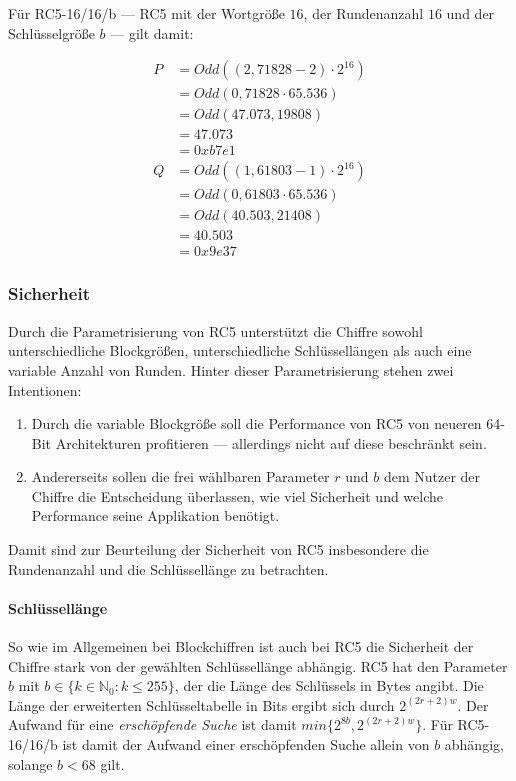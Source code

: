 \documentclass[course=erap]{aspdoc}
\begin{document}
Für RC5-16/16/b --- RC5 mit der Wortgröße $16$, der Rundenanzahl $16$ und der Schlüsselgröße $b$ --- gilt damit:

\begin{align*}
    P &= Odd((2,71828 - 2) \cdot 2^{16}) \\
      &= Odd(0,71828 \cdot 65.536) \\
      &= Odd(47.073,19808) \\
      &= 47.073 \\
      &= 0xb7e1 \\
    Q &= Odd((1,61803 - 1) \cdot 2^{16}) \\
      &= Odd(0,61803 \cdot 65.536) \\
      &= Odd(40.503,21408) \\
      &= 40.503 \\
      &= 0x9e37
\end{align*}

\subsubsection{Sicherheit}

Durch die Parametrisierung von RC5\cite[p.2]{rc5rev} unterstützt die Chiffre sowohl unterschiedliche Blockgrößen, unterschiedliche Schlüssellängen als auch eine variable Anzahl von Runden. Hinter dieser Parametrisierung stehen zwei Intentionen:

\begin{enumerate}
    \item Durch die variable Blockgröße soll die Performance von RC5 von neueren 64-Bit Architekturen profitieren --- allerdings nicht auf diese beschränkt sein.\cite[p.1]{rc5rev}
    \item Andererseits sollen die frei wählbaren Parameter $r$ und $b$ dem Nutzer der Chiffre die Entscheidung überlassen, wie viel Sicherheit und welche Performance seine Applikation benötigt.\cite[p.1]{rc5rev}
\end{enumerate}

Damit sind zur Beurteilung der Sicherheit von RC5 insbesondere die Rundenanzahl und die Schlüssellänge zu betrachten.

\paragraph{Schlüssellänge} So wie im Allgemeinen bei Blockchiffren ist auch bei RC5 die Sicherheit der Chiffre stark von der gewählten Schlüssellänge abhängig. RC5 hat den Parameter $b$ mit $b \in \{k \in \mathbb{N}_0 \colon k \leq 255\}$, der die Länge des Schlüssels in Bytes angibt.\cite[p.3]{rc5rev} Die Länge der erweiterten Schlüsseltabelle in Bits ergibt sich durch $2^{(2r + 2)w}$.\cite[p.2]{rc5rev} Der Aufwand für eine \textit{erschöpfende Suche} ist damit $min\{2^{8b}, 2^{(2r + 2)w}\}$.\cite[p.29]{kaliski+yin} Für RC5-16/16/b ist damit der Aufwand einer erschöpfenden Suche allein von $b$ abhängig, solange $b < 68$ gilt.\bigbreak
\end{document}
